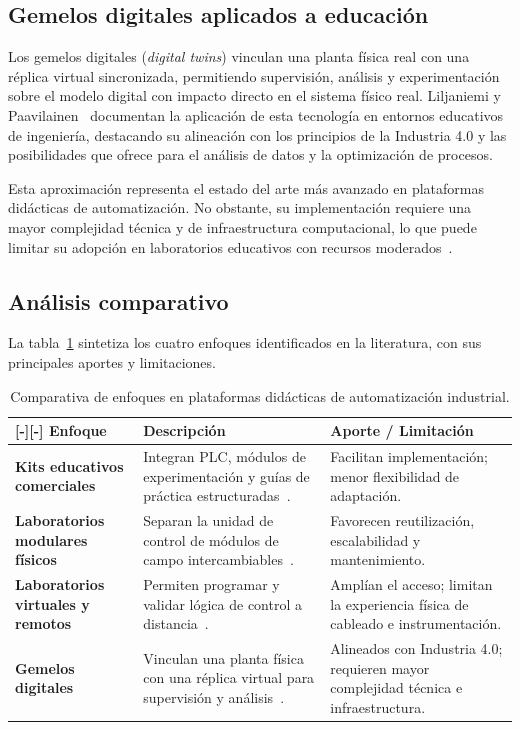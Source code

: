 \documentclass[12pt,a4paper,oneside]{report}
\newcommand{\filacolor}[1]{\rowcolor{#1}[\dimexpr\tabcolsep-\arrayrulewidth\relax][\dimexpr\tabcolsep-\arrayrulewidth\relax]}
\begin{document}
\subsection{Gemelos digitales aplicados a educación}

Los gemelos digitales (\textit{digital twins}) vinculan una planta física real con una réplica virtual sincronizada, permitiendo supervisión, análisis y experimentación sobre el modelo digital con impacto directo en el sistema físico real. Liljaniemi y Paavilainen~\cite{ref6} documentan la aplicación de esta tecnología en entornos educativos de ingeniería, destacando su alineación con los principios de la Industria 4.0 y las posibilidades que ofrece para el análisis de datos y la optimización de procesos.

Esta aproximación representa el estado del arte más avanzado en plataformas didácticas de automatización. No obstante, su implementación requiere una mayor complejidad técnica y de infraestructura computacional, lo que puede limitar su adopción en laboratorios educativos con recursos moderados~\cite{ref6}.

\subsection{Análisis comparativo}

La tabla~\ref{tab:estadoarte} sintetiza los cuatro enfoques identificados en la literatura, con sus principales aportes y limitaciones.

\begin{table}[H]
\centering
\caption{Comparativa de enfoques en plataformas didácticas de automatización industrial.}
\label{tab:estadoarte}
\renewcommand{\arraystretch}{1.35}
\begin{tabularx}{\textwidth}{|>{\bfseries}p{3.5cm}|X|p{5.5cm}|}
\hline
\filacolor{TableGray}
\textbf{Enfoque} & \textbf{Descripción} & \textbf{Aporte / Limitación} \\
\hline
Kits educativos comerciales & Integran PLC, módulos de experimentación y guías de práctica estructuradas~\cite{ref2,ref3}. & Facilitan implementación; menor flexibilidad de adaptación. \\
\hline
Laboratorios modulares físicos & Separan la unidad de control de módulos de campo intercambiables~\cite{ref4}. & Favorecen reutilización, escalabilidad y mantenimiento. \\
\hline
Laboratorios virtuales y remotos & Permiten programar y validar lógica de control a distancia~\cite{ref4,ref5}. & Amplían el acceso; limitan la experiencia física de cableado e instrumentación. \\
\hline
Gemelos digitales & Vinculan una planta física con una réplica virtual para supervisión y análisis~\cite{ref6}. & Alineados con Industria 4.0; requieren mayor complejidad técnica e infraestructura. \\
\hline
\end{tabularx}
\end{table}
\end{document}
